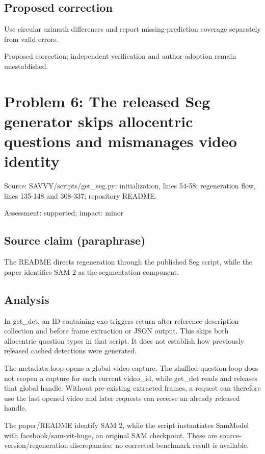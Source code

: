 \documentclass[11pt]{article}
\begin{document}
\subsection*{Proposed correction}

Use circular azimuth differences and report missing-prediction coverage separately from valid errors.

Proposed correction; independent verification and author adoption remain unestablished.

\section*{Problem 6: The released Seg generator skips allocentric questions and mismanages video identity}

Source: SAVVY/scripts/get\_seg.py: initialization, lines 54-58; regeneration flow, lines 135-148 and 308-337; repository README.

Assessment: supported; impact: minor

\subsection*{Source claim (paraphrase)}

The README directs regeneration through the published Seg script, while the paper identifies SAM \(2\) as the segmentation component.

\subsection*{Analysis}

In get\_det, an ID containing exo triggers return after reference-description collection and before frame extraction or JSON output. This skips both allocentric question types in that script. It does not establish how previously released cached detections were generated.

The metadata loop opens a global video capture. The shuffled question loop does not reopen a capture for each current video\_id, while get\_det reads and releases that global handle. Without pre-existing extracted frames, a request can therefore use the last opened video and later requests can receive an already released handle.

The paper/README identify SAM \(2\), while the script instantiates SamModel with facebook/sam-vit-huge, an original SAM checkpoint. These are source-version/regeneration discrepancies; no corrected benchmark result is available.
\end{document}
